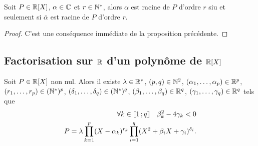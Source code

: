 \begin{prop}
  Soit \(P \in \mathbb{R}[X]\), \(\alpha \in \mathbb{C}\) et \(r \in \mathbb{N}^*\), alors \(\alpha\) 
  est racine de \(P\) d'ordre \(r\) siu et seulement si \(\bar{\alpha}\) est 
  racine de \(P\) d'ordre \(r\).
\end{prop}
\begin{proof}
  C'est une conséquence immédiate de la proposition précédente.
\end{proof}

\subsection{Factorisation sur \(\mathbb{R}\) d'un polynôme de \(\mathbb{R}[X]\)}

\begin{theo}
  Soit \(P \in \mathbb{R}[X]\) non nul. Alors il existe \(\lambda \in \mathbb{R}^*\), \((p,q) 
  \in \mathbb{N}^2\), \((\alpha_1, \ldots, \alpha_p) \in \mathbb{R}^p\), \((r_1, \ldots, r_p) 
  \in (\mathbb{N}^*)^p\), \((\delta_1, \ldots, \delta_q) \in (\mathbb{N}^*)^q\), \((\beta_1, 
  \ldots, \beta_q) \in \mathbb{R}^q\), \((\gamma_1, \ldots, \gamma_q) \in \mathbb{R}^q\) tels 
  que
  \begin{align}
    \forall k \in \mathopen{\llbracket}1\mathclose{}\mathpunct{};q\mathclose{\rrbracket} \quad \beta_k^2 - 4\gamma_k <0\\
    P = \lambda \prod_{k=1}^p (X-\alpha_k)^{r_k} \prod_{i=1}^q(X^2+\beta_i 
    X+\gamma_i)^{\delta_i}.
  \end{align}
\end{theo}
